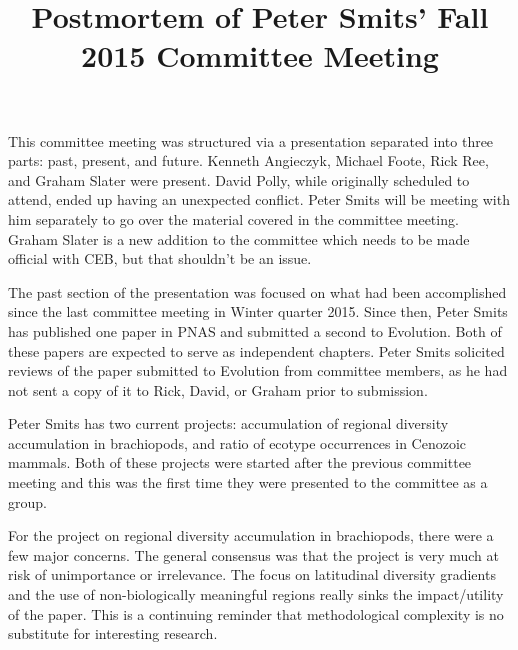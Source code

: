 \documentclass{article}
\title{Postmortem of Peter Smits' Fall 2015 Committee Meeting}
\date{}
\begin{document}
\linenumbers
\modulolinenumbers[2]

\maketitle

This committee meeting was structured via a presentation separated into three parts: past, present, and future. Kenneth Angieczyk, Michael Foote, Rick Ree, and Graham Slater were present. David Polly, while originally scheduled to attend, ended up having an unexpected conflict. Peter Smits will be meeting with him separately to go over the material covered in the committee meeting. Graham Slater is a new addition to the committee which needs to be made official with CEB, but that shouldn't be an issue.

The past section of the presentation was focused on what had been accomplished since the last committee meeting in Winter quarter 2015. Since then, Peter Smits has published one paper in PNAS and submitted a second to Evolution. Both of these papers are expected to serve as independent chapters. Peter Smits solicited reviews of the paper submitted to Evolution from committee members, as he had not sent a copy of it to Rick, David, or Graham prior to submission.

Peter Smits has two current projects: accumulation of regional diversity accumulation in brachiopods, and ratio of ecotype occurrences in Cenozoic mammals. Both of these projects were started after the previous committee meeting and this was the first time they were presented to the committee as a group.

For the project on regional diversity accumulation in brachiopods, there were a few major concerns. The general consensus was that the project is very much at risk of unimportance or irrelevance. The focus on latitudinal diversity gradients and the use of non-biologically meaningful regions really sinks the impact/utility of the paper. This is a continuing reminder that methodological complexity is no substitute for interesting research. 
\end{document}
